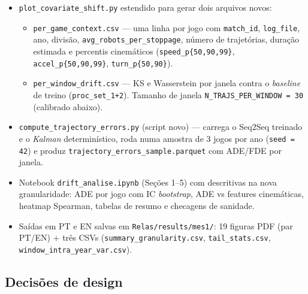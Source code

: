 \documentclass[11pt,a4paper]{article}
\begin{document}
\begin{itemize}[leftmargin=1.4em,itemsep=2pt]
    \item \texttt{plot\_covariate\_shift.py} estendido para gerar dois
          arquivos novos:
        \begin{itemize}[leftmargin=1.4em,itemsep=1pt]
            \item \texttt{per\_game\_context.csv} --- uma linha por jogo
                  com \texttt{match\_id}, \texttt{log\_file}, ano, divis\~ao,
                  \texttt{avg\_robots\_per\_stoppage}, n\'umero de
                  trajet\'orias, dura\c{c}\~ao estimada e percentis
                  cinem\'aticos (\texttt{speed\_p\{50,90,99\}},
                  \texttt{accel\_p\{50,90,99\}}, \texttt{turn\_p\{50,90\}}).
            \item \texttt{per\_window\_drift.csv} --- KS e Wasserstein por
                  janela contra o \emph{baseline} de treino
                  (\texttt{proc\_set\_1+2}). Tamanho de janela
                  \texttt{N\_TRAJS\_PER\_WINDOW = 30} (calibrado abaixo).
        \end{itemize}
    \item \texttt{compute\_trajectory\_errors.py} (script novo) --- carrega
          o Seq2Seq treinado e o \emph{Kalman} determin\'istico, roda numa
          amostra de 3 jogos por ano (\texttt{seed = 42}) e produz
          \texttt{trajectory\_errors\_sample.parquet} com ADE/FDE por
          janela.
    \item Notebook \texttt{drift\_analise.ipynb} (Se\c{c}\~oes 1--5) com
          descritivas na nova granularidade: ADE por jogo com IC
          \emph{bootstrap}, ADE vs features cinem\'aticas, heatmap
          Spearman, tabelas de resumo e checagens de sanidade.
    \item Sa\'idas em PT e EN salvas em \texttt{Relas/results/mes1/}: 19
          figuras PDF (par PT/EN) + tr\^es CSVs
          (\texttt{summary\_granularity.csv}, \texttt{tail\_stats.csv},
          \texttt{window\_intra\_year\_var.csv}).
\end{itemize}

\subsection{Decis\~oes de design}
\end{document}
